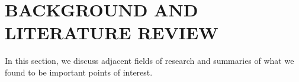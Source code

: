 \section{BACKGROUND AND LITERATURE REVIEW}

In this section, we discuss adjacent fields of research and summaries of what we
found to be important points of interest.

\begin{comment}
\subsection{Social and Professional Issues}
ACM/IEEE establish international curricular guidelines for undergradute programs
in computing in volumes CS2001, CS2008, and CS2013.  CS2013 specifies the
following principles:

\begin{enumerate}
  \item Computer Science curricula should be designed to provide students with
  the flexibility to work across many disciplines\ldots
  \item Computer Science curricula should be designed to prepare graduates for a
  variety of professions, attracting the full range of talent to the field\ldots
  \item CS2013 should provide guidance for the expected level of mastery of
  topics by graduates\ldots
  \item CS2013 must provide realistic, adoptable recommendations that provide
  guidance and flexibility, allowing curricular designs that are innovative ad
  track recent developments in the field\ldots
  \item The CS2013 guidelines must be relevant to a variety of institutions\ldots
  \item The size of the essential knowledge must be managed\ldots
  \item Computer Science curricula should be designed to prepare graduates to
  succeed in a rapidly changing field\ldots
  \item CS2013 should identify the fundamental skills and knowledge that all
  computer science graduates should posses providing the greatest flexibility in
  selecting topics\ldots
  \item CS2013 should provide the greatest flexibility in organizing topics into
  courses and curricula\ldots
  \item The deveopment and review of CS2013 must be broadly based\ldots
\end{enumerate}
\end{comment}


